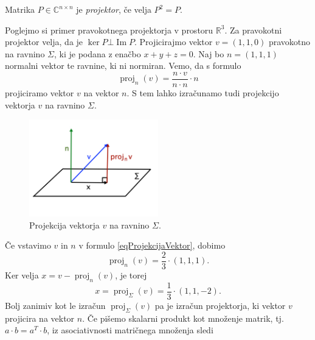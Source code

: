 \documentclass[mat1]{fmfdelo}
\newcommand{\R}{\mathbb R}
\newcommand{\C}{\mathbb C}
\DeclareMathOperator{\Ima}{Im}
\begin{document}
\begin{definicija}
    Matrika $P \in \C^{n \times n}$ je \emph{projektor}, če velja $P^2 = P$.
\end{definicija}
\begin{zgled}
    Poglejmo si primer pravokotnega projektorja v prostoru $\R^3$. Za pravokotni projektor velja, da je $\ker P \bot \Ima P$. Projicirajmo vektor $v = (1,1,0)$ pravokotno na ravnino $\Sigma$, ki je podana z enačbo $x + y + z = 0$. Naj bo $n = (1,1,1)$ normalni vektor te ravnine, ki ni normiran. Vemo, da s formulo
    \begin{equation}\label{eqProjekcijaVektor}
        \operatorname{proj}_{n}(v) = \frac{n \cdot v}{n\cdot n}\cdot n
    \end{equation}
    projiciramo vektor $v$ na vektor $n$. S tem lahko izračunamo tudi projekcijo vektorja $v$ na ravnino $\Sigma$.
    \begin{figure}[H]
        \vspace{-10pt}
        \centering
        \includegraphics[width=0.5\textwidth]{projekcija.jpg}
        \vspace{-25pt}
        \caption{Projekcija vektorja $v$ na ravnino $\Sigma$.}
    \end{figure}
    Če vstavimo $v$ in $n$ v formulo \eqref{eqProjekcijaVektor}, dobimo
    \begin{equation*}
        \operatorname{proj}_{n}(v) = \frac{2}{3}\cdot (1,1,1).
    \end{equation*}
    Ker velja $x = v - \operatorname{proj}_{n}(v)$, je torej
    \begin{equation*}
        x = \operatorname{proj}_\Sigma (v) = \frac{1}{3}\cdot (1,1,-2).
    \end{equation*}
    Bolj zanimiv kot le izračun $\operatorname{proj}_\Sigma (v)$ pa je izračun projektorja, ki vektor $v$ projicira na vektor $n$. Če pišemo skalarni produkt kot množenje matrik, tj.\ $a\cdot b = a^T \cdot b$, iz asociativnosti matričnega množenja sledi
    \begin{equation*}

\end{equation*}
\end{zgled}
\end{document}

